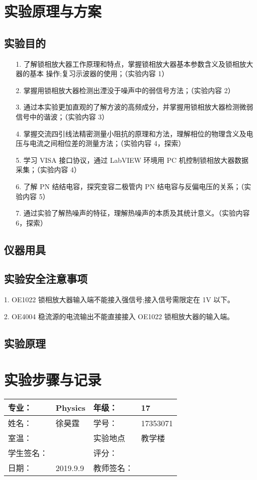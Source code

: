 \documentclass{ctexart}
\begin{document}
\section{实验原理与方案}
\subsection{实验目的}
\begin{enumerate}
 \item[1.]了解锁相放大器工作原理和特点，掌握锁相放大器基本参数含义及锁相放大器的基本 操作;复习示波器的使用；（实验内容 1）
  \item[2.]掌握用锁相放大器检测出湮没于噪声中的弱信号方法；（实验内容 2）
  \item[3.]通过本实验更加直观的了解方波的高频成分，并掌握用锁相放大器检测微弱信号中的谐波；（实验内容 3）
\item[4.]掌握交流四引线法精密测量小阻抗的原理和方法，理解相位的物理含义及电压与电流之间相位差的测量方法；（实验内容 4，探索）
\item[5.] 学习 VISA 接口协议，通过 LabVIEW 环境用 PC 机控制锁相放大器数据采集；（实验内容 4）
\item[6.]了解 PN 结结电容，探究变容二极管内 PN 结电容与反偏电压的关系；（实验内容 5）
\item[7.] 通过实验了解热噪声的特征，理解热噪声的本质及其统计意义。（实验内容 6，探索）
\end{enumerate}


\subsection{仪器用具}


\subsection{实验安全注意事项}

1. OE1022 锁相放大器输入端不能接入强信号;接入信号需限定在 1V 以下。

2. OE4004 稳流源的电流输出不能直接接入 OE1022 锁相放大器的输入端。

\subsection{实验原理}


\newpage
\section{实验步骤与记录}
\begin{tabular}{|p{8em}|p{8em}|p{8em}|p{8em}|}
	\hline 
	专业：     &Physics       &年级：      & 17     \\
	\hline
	姓名：& 徐昊霆 &学号：&17353071  \\
	\hline
	室温：&                    &实验地点 & 教学楼 \\
	\hline	
	学生签名： & & 评分： & \\
	\hline
	日期： & 2019.9.9 & 教师签名：&  \\
	\hline
\end{tabular}
\end{document}

